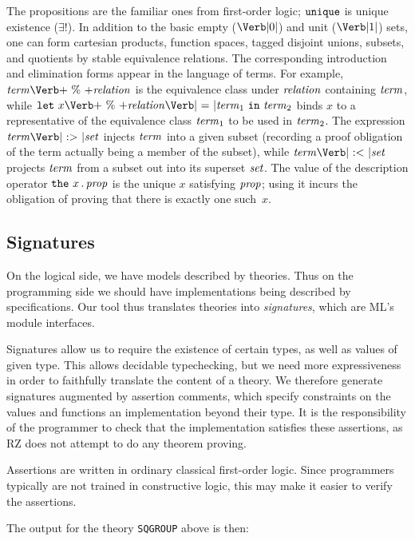 The propositions are the familiar ones from first-order logic;
$\mbox{\texttt{unique}}$ is unique existence ($\exists!$). In addition to the basic
empty ($\ZERO$) and unit ($\ONE$) sets, one can form cartesian
products, function spaces, tagged disjoint unions, subsets, and
quotients by stable equivalence relations. The corresponding
introduction and elimination forms appear in the language of terms.
For example, $\Term \PERCENT \metav{relation}$ is the equivalence
class under $\mbox{\textit{relation}}$ containing $\mbox{\textit{term}}$, while $\LET\ x
\PERCENT \metav{relation} \mbox{\Verb| = |} \Term_1\ \IN\ \Term_2$
binds $x$ to a representative of the equivalence class $\mbox{\textit{term}}_1$ to be
used in $\mbox{\textit{term}}_2$. The expression $\Term \SUBIN \Set$ injects $\mbox{\textit{term}}$
into a given subset (recording a proof obligation of the term actually
being a member of the subset), while $\Term \SUBOUT \Set$ projects
$\mbox{\textit{term}}$ from a subset out into its superset $\mbox{\textit{set}}$. The value of the
description operator $\mbox{\texttt{the}}\ x \,.\, \mbox{\textit{prop}}$ is the unique $x$
satisfying $\mbox{\textit{prop}}$; using it incurs the obligation of proving that
there is exactly one such~$x$.


\subsection{Signatures}
\label{sec:signatures}

On the logical side, we have models described by theories.  Thus on
the programming side we should have implementations being described by
specifications.  Our tool thus translates theories into
\emph{signatures}, which are ML's module interfaces.

Signatures allow us to require the existence of certain types, as well
as values of given type.  This allows decidable typechecking, but we
need more expressiveness in order to faithfully translate the content
of a theory.  We therefore generate signatures augmented by assertion
comments, which specify constraints on the values and functions an
implementation beyond their type.  It is the responsibility of the
programmer to check that the implementation satisfies these
assertions, as RZ does not attempt to do any theorem proving.

Assertions are written in ordinary classical first-order logic. Since
programmers typically are not trained in constructive logic, this may
make it easier to verify the assertions.

The output for the theory \Verb|SQGROUP| above is then:
{\small {}}

